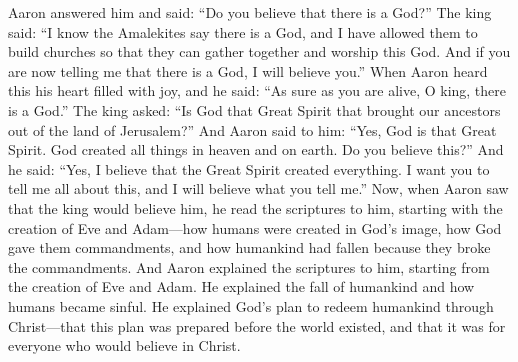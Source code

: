 Aaron answered him and said: ``Do you believe that there is a God?'' The king said: ``I know the Amalekites say there is a God, and I have allowed them to build churches so that they can gather together and worship this God. And if you are now telling me that there is a God, I will believe you.''
\bverse \iffalse And now when Aaron heard this, his heart began to rejoice, and he said: Behold, assuredly as thou livest, O king, there is a God. \fi
When Aaron heard this his heart filled with joy, and he said: ``As sure as you are alive, O king, there is a God.''
\bverse \iffalse And the king said: Is God that Great Spirit that brought our fathers out of the land of Jerusalem? \fi
The king asked: ``Is God that Great Spirit that brought our ancestors out of the land of Jerusalem?''
\bverse \iffalse And Aaron said unto him: Yea, he is that Great Spirit, and he created all things both in heaven and in earth. Believest thou this? \fi
And Aaron said to him: ``Yes, God is that Great Spirit. God created all things in heaven and on earth. Do you believe this?''
\bverse \iffalse And he said: Yea, I believe that the Great Spirit created all things, and I desire that ye should tell me concerning all these things, and I will believe thy words. \fi
And he said: ``Yes, I believe that the Great Spirit created everything. I want you to tell me all about this, and I will believe what you tell me.''
\bverse \iffalse And it came to pass that when Aaron saw that the king would believe his words, he began from the creation of Adam, reading the scriptures unto the king--how God created man after his own image, and that God gave him commandments, and that because of transgression, man had fallen. \fi
Now, when Aaron saw that the king would believe him, he read the scriptures to him, starting with the creation of Eve and Adam---how humans were created in God's image, how God gave them commandments, and how humankind had fallen because they broke the commandments.
\bverse \iffalse And Aaron did expound unto him the scriptures from the creation of Adam, laying the fall of man before him, and their carnal state and also the plan of redemption, which was prepared from the foundation of the world, through Christ, for all whosoever would believe on his name. \fi
And Aaron explained the scriptures to him, starting from the creation of Eve and Adam. He explained the fall of humankind and how humans became sinful. He explained God's plan to redeem humankind through Christ---that this plan was prepared before the world existed, and that it was for everyone who would believe in Christ.

